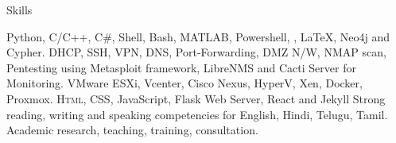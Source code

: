 
\begin{rubric}{Skills}

%	
	Python, C/C++, C\#, Shell, Bash, \textsc{MATLAB}, Powershell, , \LaTeX, Neo4j and Cypher. 
%	
	DHCP, SSH, VPN, DNS, Port-Forwarding, DMZ N/W, NMAP scan, Pentesting using Metasploit framework, LibreNMS and Cacti Server for Monitoring.
%	
%	
\entry*[Virtualization]
	VMware ESXi, Vcenter, Cisco Nexus, HyperV, Xen, Docker, Proxmox.
%	
	\textsc{Html, CSS}, JavaScript, Flask Web Server, React and Jekyll
%
\entry*[Languages]
	Strong reading, writing and speaking competencies for English, Hindi, Telugu, Tamil.
%	
\entry*[Misc.]
	Academic research, teaching, training, consultation.
\end{rubric}
